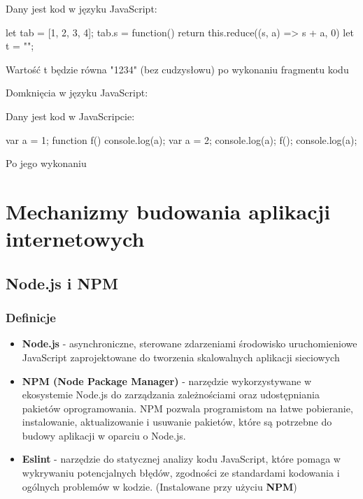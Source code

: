 \begin{problems}
    \prob Dany jest kod w języku JavaScript:
    \begin{js}
        let tab = [1, 2, 3, 4];
        tab.s = function() { return this.reduce((s, a) => s + a, 0) }
        let t = "";
    \end{js}
    Wartość t będzie równa "1234" (bez cudzysłowu) po wykonaniu fragmentu kodu
    
    \prob Domknięcia w języku JavaScript:

    \prob Dany jest kod w JavaScripcie:
    \begin{js}
        var a = 1;
        function f() {
            console.log(a);
            var a = 2;
            console.log(a);
        }
        f();
        console.log(a);
    \end{js}
    Po jego wykonaniu
\end{problems}

\section{Mechanizmy budowania aplikacji internetowych}

\subsection{Node.js i NPM}
\subsubsection{Definicje}
\begin{itemize}
    \item \textbf{Node.js} - asynchroniczne, sterowane zdarzeniami środowisko uruchomieniowe JavaScript zaprojektowane do tworzenia skalowalnych aplikacji sieciowych 
    \item \textbf{NPM (Node Package Manager)} - narzędzie wykorzystywane w ekosystemie Node.js do zarządzania zależnościami oraz udostępniania pakietów oprogramowania. NPM pozwala programistom na łatwe pobieranie, instalowanie, aktualizowanie i usuwanie pakietów, które są potrzebne do budowy aplikacji w oparciu o Node.js.
    \item \textbf{Eslint} - narzędzie do statycznej analizy kodu JavaScript, które pomaga w wykrywaniu potencjalnych błędów, zgodności ze standardami kodowania i ogólnych problemów w kodzie. (Instalowane przy użyciu \textbf{NPM})

\end{itemize}



